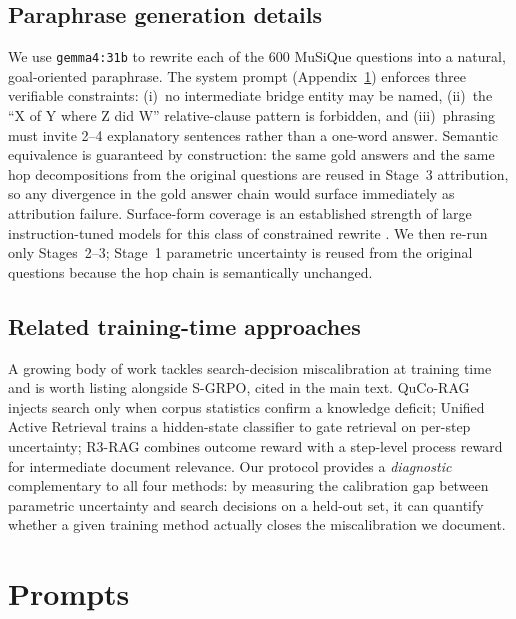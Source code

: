 \documentclass[10pt,letterpaper]{article}
\begin{document}
\subsection{Paraphrase generation details}\label{app:operational:paraphrase}
We use \texttt{gemma4:31b} to rewrite each of the 600 MuSiQue questions into a natural,
goal-oriented paraphrase. The system prompt (Appendix~\ref{app:prompts}) enforces three
verifiable constraints: (i)~no intermediate bridge entity may be named, (ii)~the
``X of Y where Z did W'' relative-clause pattern is forbidden, and (iii)~phrasing must
invite 2--4 explanatory sentences rather than a one-word answer. Semantic equivalence
is guaranteed by construction: the same gold answers and the same hop decompositions
from the original questions are reused in Stage~3 attribution, so any divergence in the
gold answer chain would surface immediately as attribution failure. Surface-form
coverage is an established strength of large instruction-tuned models for this class
of constrained rewrite \citep{howask2026,knowingdoing2026}. We then re-run only
Stages~2--3; Stage~1 parametric uncertainty is reused from the original questions
because the hop chain is semantically unchanged.

\subsection{Related training-time approaches}\label{app:operational:training}
A growing body of work tackles search-decision miscalibration at training time and is
worth listing alongside S-GRPO, cited in the main text. QuCo-RAG \citep{qucoraq2024}
injects search only when corpus statistics confirm a knowledge deficit; Unified Active
Retrieval \citep{uar2024} trains a hidden-state classifier to gate retrieval on
per-step uncertainty; R3-RAG \citep{r3rag2025} combines outcome reward with a
step-level process reward for intermediate document relevance. Our protocol provides a
\emph{diagnostic} complementary to all four methods: by measuring the calibration gap
between parametric uncertainty and search decisions on a held-out set, it can quantify
whether a given training method actually closes the miscalibration we document.

\section{Prompts}\label{app:prompts}
\end{document}
